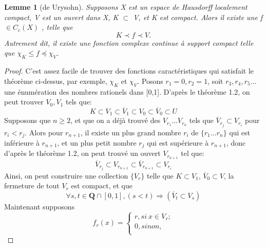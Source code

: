 \documentclass{article}
\newtheorem*{lemma}{Lemme}
\begin{document}
\begin{lemma}[de Urysohn]
Supposons X est un espace de Hausdorff localement compact, V est un ouvert dans X, K $\subset$ V, et K est compact. Alors il existe une f $\in C_{c}(X)$ , telle que 
\[K\prec f \prec V .\]
Autrement dit, il existe une fonction complexe continue à support compact telle que $\chi _{K} \leq f \preceq  \chi _{V}$. 
\end{lemma}

\begin{proof}
C'est assez facile de trouver des fonctions caractéristiques qui satisfait le théorème ci-dessus, par exemple, $\chi _{K}$ et $\chi _{V}$.  
Posons $r_{1}=0, r_{2}=1$, soit $r_{3}, r_{4}, r_{5} ...$ une énumération des nombres rationels dans [0,1]. D'après le théorème 1.2, on peut trouver $V_{0}, V_{1}$ tels que: 
\[K \subset V_{1} \subset \overline{V}_{1} \subset V_{0} \subset \overline{V}_{0}\subset U\]
Supposons que $n \geq 2$, et que on a déjà trouvé des $V_{r_{1}} \dots V_{r_{n}}$ tels que $\overline{V}_{r_{j}} \subset V_{r_{i}}$ pour $ r_{i} < r_{j} $. Alors pour $r_{n+1}$, il existe un plus grand nombre $r_{i}$ de $\{r_{1} \dots r_{n}\}$ qui est inférieure à $r_{n+1}$, et un plus petit nombre $r_{j}$ qui est supérieure à $r_{n+1}$, donc d'après le théorème 1.2, on peut trouvé un ouvert $V_{r_{n+1}}$ tel que:
\[\overline{V}_{r_{j}} \subset V_{r_{n+1}} \subset \overline{V}_{r_{n+1}} \subset V_{r_{i}} \]
Ainsi, on peut construire une collection $\{V_{r}\}$ telle que $K \subset V_{1}$, $\overline{V}_{0} \subset V$, la fermeture de tout $V_{r}$ est compact, et que 
\[ \forall s,t \in \mathbf{Q} \cap [0,1],  ( s < t )  \Rightarrow  (\overline{V}_{t} \subset V_{s} )\]
Maintenant supposons 
\[ f_{r} (x)= 
    \begin{cases}
    r, si\ x \in V_{r} ; \\
    0, sinon, \\
    \end{cases} \]


\end{proof}
\end{document}

